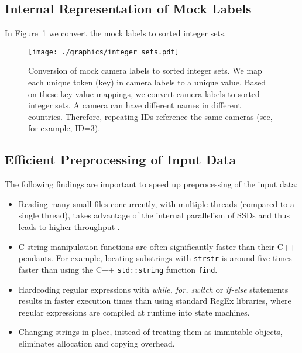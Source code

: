 \documentclass[sigconf]{acmart}
\begin{document}
\subsection{Internal Representation of Mock Labels}
\label{sub:sec:internal}

In Figure~\ref{fig:integer:sets} we convert the mock labels to sorted integer sets.



\begin{figure}[htbp]
  \centering
  \texttt{[image: ./graphics/integer\_sets.pdf]}
  \caption{Conversion of mock camera labels to sorted integer sets. 
We map each unique token (key) in camera labels to a unique value. 
Based on these key-value-mappings, we convert camera labels to sorted integer sets. 
A camera can have different names in different countries. Therefore, repeating IDs reference the same cameras (see, for example, ID=3).} 
  \label{fig:integer:sets}
\end{figure}

\subsection{Efficient Preprocessing of Input Data}
\label{sub:sec:preprocessing}

The following findings are important to speed up preprocessing of the input data:

\begin{itemize}
\item Reading many small files concurrently, with multiple threads (compared to a single thread), takes advantage of the internal parallelism of SSDs and thus leads to higher throughput \cite{Zhuang2016}.

\item C-string manipulation functions are often significantly faster than their C++ pendants. For example, locating substrings with \texttt{strstr} is around five times faster than using the C++ \texttt{std::string} function \texttt{find}.

\item Hardcoding regular expressions with \emph{while, for, switch} or \emph{if-else} statements results in faster execution times than using standard RegEx libraries, where regular expressions are compiled at runtime into state machines.

\item Changing strings in place, instead of treating them as immutable objects, eliminates allocation and copying overhead.

\end{itemize}
\end{document}
